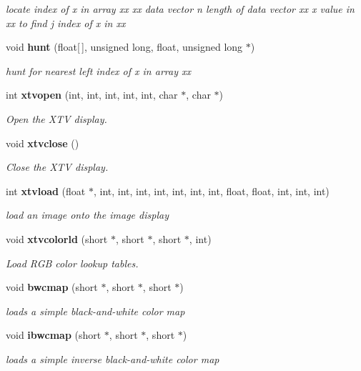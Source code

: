 \begin{CompactItemize}
\begin{CompactList}\small\item\em locate index of x in array xx xx data vector n length of data vector xx x value in xx to find j index of x in xx \item\end{CompactList}\item 
void {\bf hunt} (float[$\,$], unsigned long, float, unsigned long $\ast$)
\begin{CompactList}\small\item\em hunt for nearest left index of x in array xx \item\end{CompactList}\item 
int {\bf xtvopen} (int, int, int, int, int, char $\ast$, char $\ast$)
\begin{CompactList}\small\item\em Open the XTV display. \item\end{CompactList}\item 
void {\bf xtvclose} ()
\begin{CompactList}\small\item\em Close the XTV display. \item\end{CompactList}\item 
int {\bf xtvload} (float $\ast$, int, int, int, int, int, int, int, float, float, int, int, int)
\begin{CompactList}\small\item\em load an image onto the image display \item\end{CompactList}\item 
void {\bf xtvcolorld} (short $\ast$, short $\ast$, short $\ast$, int)
\begin{CompactList}\small\item\em Load RGB color lookup tables. \item\end{CompactList}\item 
void {\bf bwcmap} (short $\ast$, short $\ast$, short $\ast$)
\begin{CompactList}\small\item\em loads a simple black-and-white color map \item\end{CompactList}\item 
void {\bf ibwcmap} (short $\ast$, short $\ast$, short $\ast$)
\begin{CompactList}\small\item\em loads a simple inverse black-and-white color map \item\end{CompactList}\end{CompactItemize}



